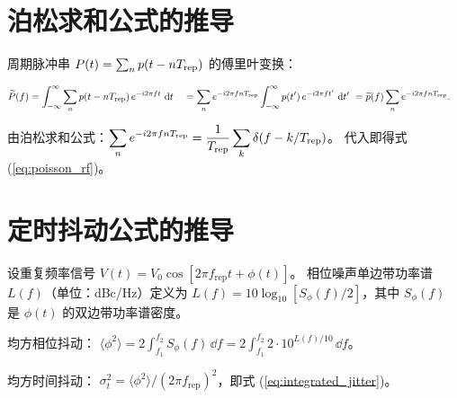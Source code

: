 \documentclass[11pt,a4paper]{article}
\newcommand{\rep}{f_{\text{rep}}}
\begin{document}
\section{泊松求和公式的推导}

周期脉冲串 $P(t) = \sum_n p(t - nT_{\rm rep})$ 的傅里叶变换：

\begin{equation}
\begin{aligned}
\widetilde{P}(f) &= \int_{-\infty}^{\infty} \sum_n p(t - nT_{\rm rep})\,e^{-i2\pi f t}\,\dd{t} \
&= \sum_n e^{-i2\pi f n T_{\rm rep}} \int_{-\infty}^{\infty} p(t')\,e^{-i2\pi f t'}\,\dd{t'} \
&= \widetilde{p}(f) \sum_n e^{-i2\pi f n T_{\rm rep}}.
\end{aligned}
\end{equation}

由泊松求和公式：$\displaystyle\sum_n e^{-i2\pi f n T_{\rm rep}} = \frac{1}{T_{\rm rep}}\sum_k \delta(f - k/T_{\rm rep})$。
代入即得式 (\ref{eq:poisson_rf})。

\section{定时抖动公式的推导}

设重复频率信号 $V(t) = V_0\cos[2\pi\rep t + \phi(t)]$。
相位噪声单边带功率谱 $L(f)$（单位：dBc/Hz）定义为
$L(f) = 10\log_{10}[S_\phi(f)/2]$，其中 $S_\phi(f)$ 是 $\phi(t)$ 的双边带功率谱密度。

均方相位抖动：
$\langle\phi^2\rangle = 2\int_{f_1}^{f_2} S_\phi(f)\,\dd{f}
                     = 2\int_{f_1}^{f_2} 2\cdot 10^{L(f)/10}\,\dd{f}$。

均方时间抖动：
$\sigma_t^2 = \langle\phi^2\rangle/(2\pi\rep)^2$，即式 (\ref{eq:integrated_jitter})。
\end{document}
